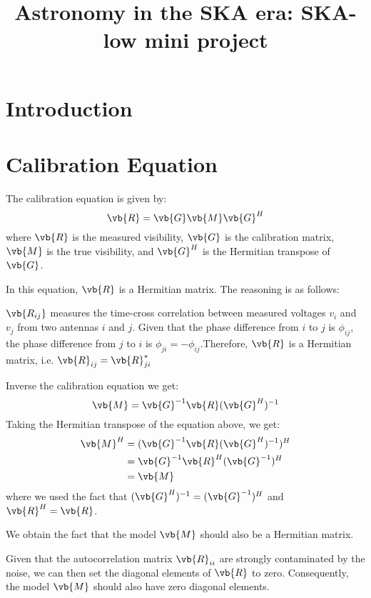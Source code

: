 \documentclass[10pt,a4paper,twocolumn]{article}
\newcommand{\topic}{Astronomy in the SKA era: SKA-low mini project}
\begin{document}
\title{\topic}
\begin{titlepage}
    \maketitle
\end{titlepage}

\newpage

\section*{Introduction}

\section{Calibration Equation}
The calibration equation is given by:
\begin{equation}
    \vb{R} = \vb{G}\vb{M}\vb{G}^{H}
\end{equation}
where $\vb{R}$ is the measured visibility, $\vb{G}$ is the calibration matrix, $\vb{M}$ is the true visibility, and $\vb{G}^{H}$ is the Hermitian transpose of $\vb{G}$. 

In this equation, $\vb{R}$ is a Hermitian matrix. The reasoning is as follows:

$\vb{R_{ij}}$ measures the time-cross correlation between measured voltages $v_i$ and $v_j$ from two antennas $i$ and $j$. Given that the phase difference from $i$ to $j$ is $\phi_{ij}$, the phase difference from $j$ to $i$ is $\phi_{ji} = -\phi_{ij}$.Therefore, $\vb{R}$ is a Hermitian matrix, i.e. $\vb{R}_{ij} = \vb{R}_{ji}^{*}$

Inverse the calibration equation we get:
\begin{equation}
    \vb{M} = \vb{G}^{-1}\vb{R}(\vb{G}^{H})^{-1}
\end{equation}
Taking the Hermitian transpose of the equation above, we get:
\begin{align}
    \vb{M}^{H} &= (\vb{G}^{-1}\vb{R}(\vb{G}^{H})^{-1})^{H}\\
    &= \vb{G}^{-1}\vb{R}^{H}(\vb{G}^{-1})^{H}\\
    &= \vb{M}
\end{align}
where we used the fact that $(\vb{G}^{H})^{-1} = (\vb{G}^{-1})^{H}$ and $\vb{R}^{H} = \vb{R}$.

We obtain the fact that the model $\vb{M}$ should also be a Hermitian matrix.

Given that the autocorrelation matrix $\vb{R}_{ii}$ are strongly contaminated by the noise, we can then set the diagonal elements of $\vb{R}$ to zero. Consequently, the model $\vb{M}$ should also have zero diagonal elements.
\end{document}
